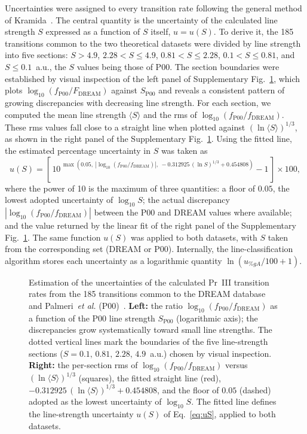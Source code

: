 \documentclass[10pt]{article}
\begin{document}
Uncertainties were assigned to every transition rate following the general
method of Kramida~\cite{Kramida2024_EPJD}. The central quantity is the
uncertainty of the calculated line strength $S$ expressed as a function of $S$
itself, $u=u(S)$. To derive it, the 185 transitions common to the two
theoretical datasets were divided by line strength into five sections:
$S>4.9$, $2.28<S\le4.9$, $0.81<S\le2.28$, $0.1<S\le0.81$, and $S\le0.1$~a.u.,
the $S$ values being those of P00. The section boundaries were established by
visual inspection of the left panel of Supplementary Fig.~\ref{fig:tp_unc},
which plots $\log_{10}(f_{\mathrm{P00}}/F_{\mathrm{DREAM}})$ against
$S_{\mathrm{P00}}$ and reveals a consistent pattern of growing discrepancies
with decreasing line strength. For each section, we computed the mean line
strength $\langle S\rangle$ and the rms of
$\log_{10}(f_{\mathrm{P00}}/f_{\mathrm{DREAM}})$. These rms values fall close
to a straight line when plotted against $(\ln\langle S\rangle)^{1/3}$, as shown
in the right panel of the Supplementary Fig.~\ref{fig:tp_unc}. Using the fitted
line, the estimated percentage uncertainty in $S$ was taken as
\begin{equation}
u(S) = \left[\,10^{\,\max\!\left(0.05,\
\left|\log_{10}(f_{\mathrm{P00}}/f_{\mathrm{DREAM}})\right|,\
-0.312925\,(\ln S)^{1/3} + 0.454808\right)} - 1\,\right]\times 100 ,
\label{eq:uS}
\end{equation}
where the power of 10 is the maximum of three quantities: a floor of $0.05$, the lowest adopted
uncertainty of $\log_{10}S$; the actual discrepancy
$\left|\log_{10}(f_{\mathrm{P00}}/f_{\mathrm{DREAM}})\right|$ between the P00
and DREAM values where available; and the value returned by the linear fit of
the right panel of the Supplementary Fig.~\ref{fig:tp_unc}. The same function
$u(S)$ was applied to both datasets, with $S$ taken from the corresponding set
(DREAM or P00). Internally, the line-classification algorithm stores each uncertainty as a
logarithmic quantity $\ln(u_{\%gA}/100 + 1)$.

\begin{figure}[t]
  \centering
  
  \caption{Estimation of the uncertainties of the calculated Pr~III transition
  rates from the 185 transitions common to the DREAM database~\cite{DREAM} and
  Palmeri~\textit{et al.} (P00)~\cite{Palmeri2000}.
  \textbf{Left:} the ratio $\log_{10}(f_{\mathrm{P00}}/f_{\mathrm{DREAM}})$ as a
  function of the P00 line strength $S_{\mathrm{P00}}$ (logarithmic axis); the
  discrepancies grow systematically toward small line strengths. The dotted
  vertical lines mark the boundaries of the five line-strength sections
  ($S=0.1,\,0.81,\,2.28,\,4.9$~a.u.) chosen by visual inspection.
  \textbf{Right:} the per-section rms of
  $\log_{10}(f_{\mathrm{P00}}/f_{\mathrm{DREAM}})$ versus
  $(\ln\langle S\rangle)^{1/3}$ (squares), the fitted straight line (red),
  $-0.312925\,(\ln\langle S\rangle)^{1/3}+0.454808$, and the floor of $0.05$
  (dashed) adopted as the lowest uncertainty of $\log_{10}S$. The fitted line
  defines the line-strength uncertainty $u(S)$ of Eq.~\eqref{eq:uS}, applied to
  both datasets.}
  \label{fig:tp_unc}
\end{figure}
\end{document}
